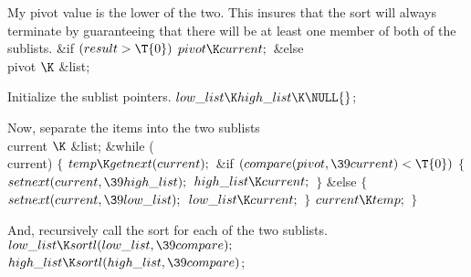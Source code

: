 My pivot value is the lower of the two.  This insures that the sort will
always terminate by guaranteeing that there will be at least one member of
both of the sublists.
\Y\B\&{if} ${}(\\{result}>\T{0}){}$\1\5
${}\\{pivot}\K\\{current};{}$\2\6
\&{else} \\{pivot} $\K$ \&{list};\par
\fi

Initialize the sublist pointers.
\Y\B$\\{low\_list}\K\\{high\_list}\K\NULL{}$;\par
\fi

Now, separate the items into the two sublists
\Y\B\\{current} $\K$ \&{list};\7
\&{while} (\\{current})\5
${}\{{}$\1\6
${}\\{temp}\K\\{getnext}(\\{current});{}$\6
\&{if} ${}(\\{compare}(\\{pivot},\39\\{current})<\T{0}){}$\5
${}\{{}$\1\6
${}\\{setnext}(\\{current},\39\\{high\_list});{}$\6
${}\\{high\_list}\K\\{current};{}$\6
\4${}\}{}$\2\6
\&{else}\5
${}\{{}$\1\6
${}\\{setnext}(\\{current},\39\\{low\_list});{}$\6
${}\\{low\_list}\K\\{current};{}$\6
\4${}\}{}$\2\6
${}\\{current}\K\\{temp};{}$\6
\4${}\}{}$\2\par
\fi

And, recursively call the sort for each of the two sublists.
\Y\B$\\{low\_list}\K\\{sortl}(\\{low\_list},\39\\{compare});{}$\6
${}\\{high\_list}\K\\{sortl}(\\{high\_list},\39\\{compare}){}$;\par
\fi

